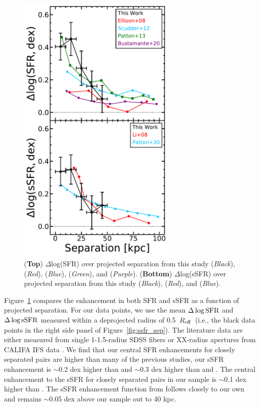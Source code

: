 \documentclass[iop,revtex4,twocolumn,apj,numberedappendix,appendixfloats]{emulateapj}
\newcommand{\reff}{$R_{\rm eff}$}
\begin{document}
\begin{figure}
\centering
\includegraphics[width=3in]{fig/nuc_sep.pdf}
\caption[]{(\textbf{Top}) $\Delta$log(SFR) over projected separation from this study ({\it Black}), \citet{Ellison:2008} ({\it Red}), \citet{Scudder:2012} ({\it Blue}), \citet{Patton:2013} ({\it Green}), and \citet{Bustamante:2020} ({\it Purple}). (\textbf{Bottom}) $\Delta$log(sSFR) over projected separation from this study ({\it Black}), \citet{Li:2008} ({\it Red}), and \citet{Patton:2020} ({\it Blue}).}
\label{fig:nuc_sep}
\end{figure}

Figure~\ref{fig:nuc_sep} compares the enhancement in both SFR and sSFR as a function of projected separation. For our data points, we use the mean $\Delta\log{\rm SFR}$ and $\Delta\log{\rm sSFR}$ measured within a deprojected radius of 0.5~\reff\ (i.e., the black data points in the right side panel of Figure~\ref{fig:ssfr_sep}). The literature data are either measured from single 1-1.5\arcsec-radius SDSS fibers \citep{Ellison:2008,Scudder:2012,Patton:2013} or XX\arcsec-radius apertures from CALIFA IFS data \citep{Bustamante:2020}. 
We find that our central SFR enhancements for closely separated pairs are higher than many of the previous studies, our sSFR enhancement is $\sim$0.2 dex higher than \citet{Scudder:2012} and $\sim$0.3 dex higher than \citet{Ellison:2008} and \citet{Bustamante:2020}. The central enhancement to the sSFR for closely separated pairs in our sample is $\sim$0.1 dex higher than \citet{Patton:2013}. The sSFR enhancement function from \citet{Li:2008} follows closely to our own and remains $\sim$0.05 dex above our sample out to 40 kpc.  
\end{document}
